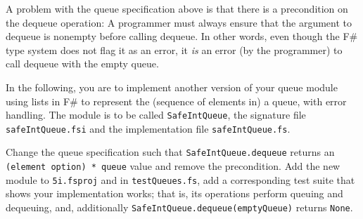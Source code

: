 A problem with the queue specification above is that there is a precondition on the dequeue operation: A programmer must always ensure that the argument to dequeue is nonempty before calling dequeue. In other words, even though the F\# type system does not flag it as an error, it \emph{is} an error (by the programmer) to call dequeue with the empty queue.


In the following, you are to implement another version of your queue module using lists in F\# to represent the (sequence of elements in) a queue, with error handling. The module is to be called \lstinline{SafeIntQueue}, the signature file \texttt{safeIntQueue.fsi} and the implementation file \texttt{safeIntQueue.fs}.

Change the queue specification such that \lstinline{SafeIntQueue.dequeue} returns an \lstinline{(element option) * queue} value and remove the precondition.
Add the new module to \texttt{5i.fsproj} and in \texttt{testQueues.fs}, add a corresponding test suite that shows your implementation works; that is, its operations perform queuing and dequeuing, and, additionally \newline \lstinline{SafeIntQueue.dequeue(emptyQueue)} returns \lstinline{None}.

